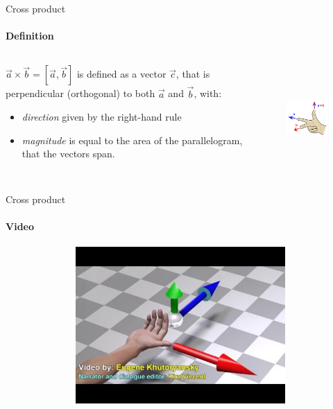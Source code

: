 \documentclass[aspectratio=169,notes]{beamer}
\begin{document}
\begin{frame}[t]{Cross product}
\framesubtitle{Definition}
    \begin{columns}[T,onlytextwidth]
        \begin{column}{0.49\textwidth}
            $\vec{a} \times \vec{b}= [\vec{a},\vec{b}]$ is defined as a vector $\vec{c}$, that is perpendicular (orthogonal) to both $\vec{a}$ and $\vec{b}$, with:
            \begin{itemize}
                \item \textit{direction} given by the right-hand rule
                \item \textit{magnitude} is equal to the area of the parallelogram, that the vectors span.
            \end{itemize}
        \end{column}
        \begin{column}{0.49\textwidth}
            \begin{figure}[H]
                \centering\includegraphics[height=4cm,width=1\textwidth,keepaspectratio]{resources/image9.png}
                \label{fig:resources/image9.png}
            \end{figure}
        \end{column}
    \end{columns}
\end{frame}

\begin{frame}[t]{Cross product}
    \framesubtitle{Video}
    \vspace{-0.6cm}
    \begin{figure}[H]
        \href{http://www.youtube.com/watch?v=h0NJK4mEIJU}{
            \centering\includegraphics[height=6cm,width=1\textwidth,keepaspectratio]{resources/image8.jpg}}
        \label{fig:resources/image8.jpg}
    \end{figure}
\end{frame}
\end{document}
